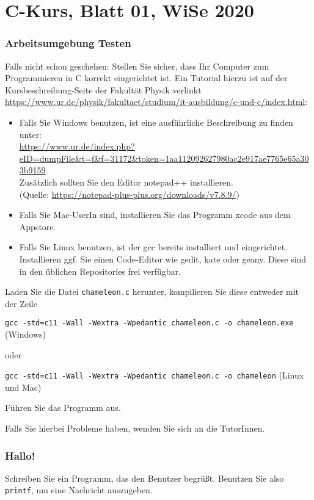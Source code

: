 \documentclass[
	ngerman,
	fontsize=10pt,
	parskip=half,
	titlepage=true,
	DIV=12
]{scrartcl}
\newcommand*{\inC}[1]{\texttt{#1}}
\begin{document}
\part*{C-Kurs, Blatt 01, WiSe 2020}

\section{Arbeitsumgebung Testen}
Falls nicht schon geschehen: Stellen Sie sicher, dass Ihr Computer zum Programmieren in C korrekt eingerichtet ist. Ein Tutorial hierzu ist auf der Kursbeschreibung-Seite der Fakultät Physik verlinkt \url{https://www.ur.de/physik/fakultaet/studium/it-ausbildung/c-und-c/index.html}:
\begin{itemize}
\item Falls Sie Windows benutzen, ist eine ausführliche Beschreibung zu finden unter: \\
	\url{https://www.ur.de/index.php?eID=dumpFile&t=f&f=31172&token=1aa112092627980ac2e917ae7765e65a303b9159} \\
	Zusätzlich sollten Sie den Editor notepad++ installieren.\\
	(Quelle: \url{https://notepad-plus-plus.org/downloads/v7.8.9/})
\item Falls Sie Mac-UserIn sind, installieren Sie das Programm xcode aus dem Appstore.
\item Falls Sie Linux benutzen, ist der gcc bereits installiert und eingerichtet. Installieren ggf. Sie einen Code-Editor wie gedit, kate oder geany. Diese sind in den
	üblichen Repositories frei verfügbar.
\end{itemize}

Laden Sie die Datei \texttt{chameleon.c} herunter, kompilieren Sie diese entweder mit der Zeile
\begin{center}
\texttt{gcc -std=c11 -Wall -Wextra -Wpedantic chameleon.c -o chameleon.exe} (Windows)
\end{center}
oder
\begin{center}
\texttt{gcc -std=c11 -Wall -Wextra -Wpedantic chameleon.c -o chameleon} (Linux und Mac)
\end{center}

Führen Sie das Programm aus.

Falls Sie hierbei Probleme haben, wenden Sie sich an die TutorInnen.



\section{Hallo!}
Schreiben Sie ein Programm, das den Benutzer begrüßt. Benutzen Sie also \inC{printf}, um eine Nachricht auszugeben.
\end{document}
